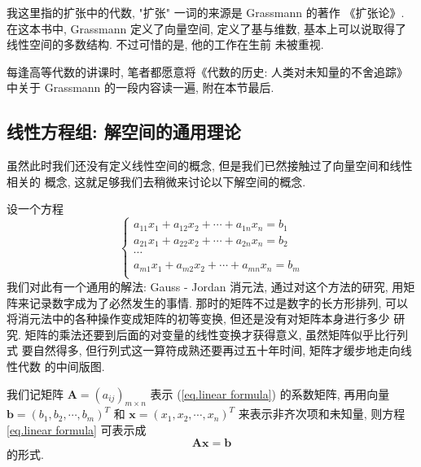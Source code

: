 \documentclass[UTF8]{book}
\begin{document}
我这里指的扩张中的代数, "扩张" 一词的来源是 Grassmann 的著作
《扩张论》. 在这本书中, Grassmann 定义了向量空间, 定义了基与维数, 
基本上可以说取得了线性空间的多数结构. 不过可惜的是, 他的工作在生前
未被重视. 

每逢高等代数的讲课时, 笔者都愿意将《代数的历史: 人类对未知量的不舍追踪》
中关于 Grassmann 的一段内容读一遍, 附在本节最后. 


\subsection{线性方程组: 解空间的通用理论}
虽然此时我们还没有定义线性空间的概念, 但是我们已然接触过了向量空间和线性相关的
概念, 这就足够我们去稍微来讨论以下解空间的概念. 

设一个方程
\begin{equation} \label{eq.linear formula}
    \begin{cases}
        a_{11} x_1 + a_{12} x_2 + \cdots + a_{1n} x_n = b_1 \\
        a_{21} x_1 + a_{22} x_2 + \cdots + a_{2n} x_n = b_2 \\
        \cdots \\
        a_{m1} x_1 + a_{m2} x_2 + \cdots + a_{mn} x_n = b_m \\
    \end{cases}
\end{equation}
我们对此有一个通用的解法: Gauss - Jordan 消元法, 通过对这个方法的研究, 
用矩阵来记录数字成为了必然发生的事情. 那时的矩阵不过是数字的长方形排列, 
可以将消元法中的各种操作变成矩阵的初等变换, 但还是没有对矩阵本身进行多少
研究. 矩阵的乘法还要到后面的对变量的线性变换才获得意义, 虽然矩阵似乎比行列式
要自然得多, 但行列式这一算符成熟还要再过五十年时间, 矩阵才缓步地走向线性代数
的中间版图. 

我们记矩阵 $\mathbf{A} = (a_{ij})_{m \times n}$ 表示 (\ref{eq.linear formula}) 
的系数矩阵, 再用向量 $\boldsymbol{b}=(b_1,b_2,\cdots,b_m)^{T}$ 和 
$ \boldsymbol{x}=(x_1,x_2,\cdots,x_n)^{T} $
来表示非齐次项和未知量, 则方程 \ref{eq.linear formula} 可表示成 
\begin{equation} \label{eq.linear formula matrix}
    \mathbf{A}\boldsymbol{x} = \boldsymbol{b}
\end{equation}
的形式. 
\end{document}

